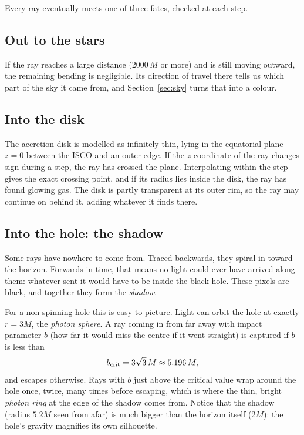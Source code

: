 \documentclass[11pt,a4paper]{article}
\begin{document}
Every ray eventually meets one of three fates, checked at each step.

\subsection{Out to the stars}

If the ray reaches a large distance (2000\,$M$ or more) and is still moving outward, the
remaining bending is negligible. Its direction of travel there tells us which part of the
sky it came from, and Section~\ref{sec:sky} turns that into a colour.

\subsection{Into the disk}

The accretion disk is modelled as infinitely thin, lying in the equatorial plane $z = 0$
between the ISCO and an outer edge. If the $z$ coordinate of the ray changes sign during a
step, the ray has crossed the plane. Interpolating within the step gives the exact crossing
point, and if its radius lies inside the disk, the ray has found glowing gas. The disk is
partly transparent at its outer rim, so the ray may continue on behind it, adding whatever
it finds there.

\subsection{Into the hole: the shadow}

Some rays have nowhere to come from. Traced backwards, they spiral in toward the horizon.
Forwards in time, that means no light could ever have arrived along them: whatever sent it
would have to be inside the black hole. These pixels are black, and together they form the
\emph{shadow}.

For a non-spinning hole this is easy to picture. Light can orbit the hole at exactly
$r = 3M$, the \emph{photon sphere}. A ray coming in from far away with impact parameter $b$
(how far it would miss the centre if it went straight) is captured if $b$ is less than
\begin{equation}
  b_{\rm crit} = 3\sqrt3\, M \approx 5.196\, M ,
\end{equation}
and escapes otherwise. Rays with $b$ just above the critical value wrap around the hole
once, twice, many times before escaping, which is where the thin, bright \emph{photon ring}
at the edge of the shadow comes from. Notice that the shadow (radius $5.2M$ seen from afar)
is much bigger than the horizon itself ($2M$): the hole's gravity magnifies its own
silhouette.
\end{document}
